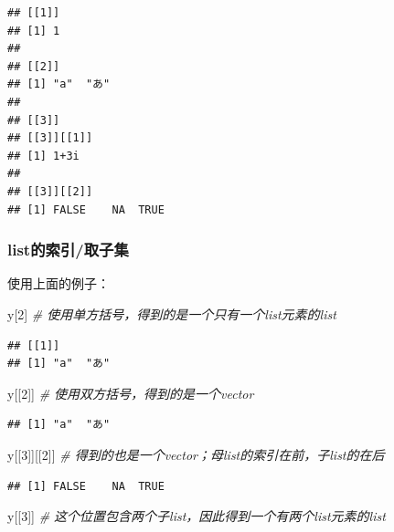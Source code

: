 \documentclass[]{book}
\newenvironment{Shaded}{\begin{snugshade}}{\end{snugshade}}
\newcommand{\CommentTok}[1]{\textcolor[rgb]{0.56,0.35,0.01}{\textit{#1}}}
\newcommand{\DecValTok}[1]{\textcolor[rgb]{0.00,0.00,0.81}{#1}}
\newcommand{\NormalTok}[1]{#1}
\begin{document}
\begin{verbatim}
## [[1]]
## [1] 1
## 
## [[2]]
## [1] "a"  "あ"
## 
## [[3]]
## [[3]][[1]]
## [1] 1+3i
## 
## [[3]][[2]]
## [1] FALSE    NA  TRUE
\end{verbatim}

\hypertarget{list}{%
\subsubsection{list的索引/取子集}\label{list}}

使用上面的例子：

\begin{Shaded}
\begin{Highlighting}[]
\NormalTok{y[}\DecValTok{2}\NormalTok{] }\CommentTok{# 使用单方括号，得到的是一个只有一个list元素的list}
\end{Highlighting}
\end{Shaded}

\begin{verbatim}
## [[1]]
## [1] "a"  "あ"
\end{verbatim}

\begin{Shaded}
\begin{Highlighting}[]
\NormalTok{y[[}\DecValTok{2}\NormalTok{]] }\CommentTok{# 使用双方括号，得到的是一个vector}
\end{Highlighting}
\end{Shaded}

\begin{verbatim}
## [1] "a"  "あ"
\end{verbatim}

\begin{Shaded}
\begin{Highlighting}[]
\NormalTok{y[[}\DecValTok{3}\NormalTok{]][[}\DecValTok{2}\NormalTok{]] }\CommentTok{# 得到的也是一个vector；母list的索引在前，子list的在后}
\end{Highlighting}
\end{Shaded}

\begin{verbatim}
## [1] FALSE    NA  TRUE
\end{verbatim}

\begin{Shaded}
\begin{Highlighting}[]
\NormalTok{y[[}\DecValTok{3}\NormalTok{]] }\CommentTok{# 这个位置包含两个子list，因此得到一个有两个list元素的list}
\end{Highlighting}
\end{Shaded}
\end{document}
